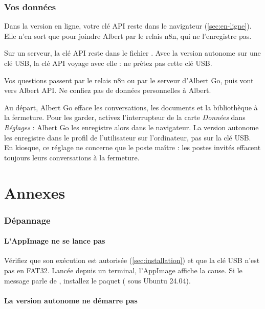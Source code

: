 \documentclass[a4paper, 11pt]{article}
\begin{document}
\section{Vos données}
\label{sec:donnees}

Dans la version en ligne, votre clé API reste dans le navigateur (\autoref{sec:en-ligne}). Elle n'en sort que pour joindre Albert par le relais n8n, qui ne l'enregistre pas.

Sur un serveur, la clé API reste dans le fichier . Avec la version autonome sur une clé USB, la clé API voyage avec elle : ne prêtez pas cette clé USB.

Vos questions passent par le relais n8n ou par le serveur d'Albert Go, puis vont vers Albert API. Ne confiez pas de données personnelles à Albert.

Au départ, Albert Go efface les conversations, les documents et la bibliothèque à la fermeture. Pour les garder, activez l'interrupteur de la carte \emph{Données} dans \emph{Réglages} : Albert Go les enregistre alors dans le navigateur. La version autonome les enregistre dans le profil de l'utilisateur sur l'ordinateur, pas sur la clé USB. En kiosque, ce réglage ne concerne que le poste maître : les postes invités effacent toujours leurs conversations à la fermeture.

%
%

\part*{Annexes}
{}

\appendix

\section{Dépannage}
\label{sec:depannage}

\subsection*{L'AppImage ne se lance pas}

Vérifiez que son exécution est autorisée (\autoref{sec:installation}) et que la clé USB n'est pas en FAT32. Lancée depuis un terminal, l'AppImage affiche la cause. Si le message parle de , installez le paquet  ( sous Ubuntu 24.04).

\subsection*{La version autonome ne démarre pas}
\end{document}
